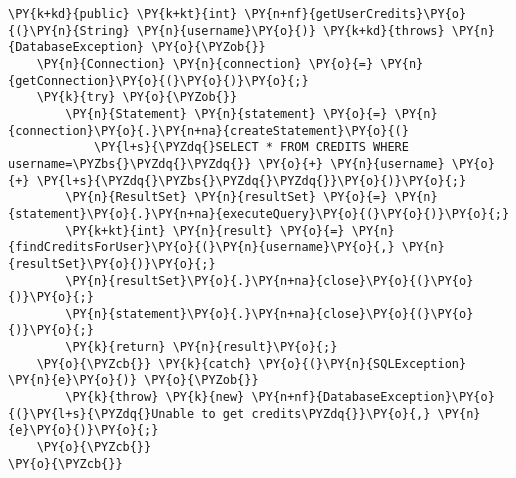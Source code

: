 \begin{Verbatim}[commandchars=\\\{\}]
\PY{k+kd}{public} \PY{k+kt}{int} \PY{n+nf}{getUserCredits}\PY{o}{(}\PY{n}{String} \PY{n}{username}\PY{o}{)} \PY{k+kd}{throws} \PY{n}{DatabaseException} \PY{o}{\PYZob{}}
    \PY{n}{Connection} \PY{n}{connection} \PY{o}{=} \PY{n}{getConnection}\PY{o}{(}\PY{o}{)}\PY{o}{;}
    \PY{k}{try} \PY{o}{\PYZob{}}
        \PY{n}{Statement} \PY{n}{statement} \PY{o}{=} \PY{n}{connection}\PY{o}{.}\PY{n+na}{createStatement}\PY{o}{(}
            \PY{l+s}{\PYZdq{}SELECT * FROM CREDITS WHERE username=\PYZbs{}\PYZdq{}\PYZdq{}} \PY{o}{+} \PY{n}{username} \PY{o}{+} \PY{l+s}{\PYZdq{}\PYZbs{}\PYZdq{}\PYZdq{}}\PY{o}{)}\PY{o}{;}
        \PY{n}{ResultSet} \PY{n}{resultSet} \PY{o}{=} \PY{n}{statement}\PY{o}{.}\PY{n+na}{executeQuery}\PY{o}{(}\PY{o}{)}\PY{o}{;}
        \PY{k+kt}{int} \PY{n}{result} \PY{o}{=} \PY{n}{findCreditsForUser}\PY{o}{(}\PY{n}{username}\PY{o}{,} \PY{n}{resultSet}\PY{o}{)}\PY{o}{;}
        \PY{n}{resultSet}\PY{o}{.}\PY{n+na}{close}\PY{o}{(}\PY{o}{)}\PY{o}{;}
        \PY{n}{statement}\PY{o}{.}\PY{n+na}{close}\PY{o}{(}\PY{o}{)}\PY{o}{;}
        \PY{k}{return} \PY{n}{result}\PY{o}{;}
    \PY{o}{\PYZcb{}} \PY{k}{catch} \PY{o}{(}\PY{n}{SQLException} \PY{n}{e}\PY{o}{)} \PY{o}{\PYZob{}}
        \PY{k}{throw} \PY{k}{new} \PY{n+nf}{DatabaseException}\PY{o}{(}\PY{l+s}{\PYZdq{}Unable to get credits\PYZdq{}}\PY{o}{,} \PY{n}{e}\PY{o}{)}\PY{o}{;}
    \PY{o}{\PYZcb{}}
\PY{o}{\PYZcb{}}
\end{Verbatim}
